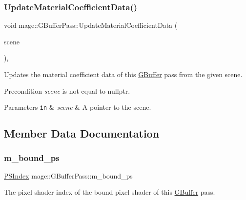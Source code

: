 \subsubsection{\texorpdfstring{Update\+Material\+Coefficient\+Data()}{UpdateMaterialCoefficientData()}}
{\footnotesize\ttfamily void mage\+::\+G\+Buffer\+Pass\+::\+Update\+Material\+Coefficient\+Data (\begin{DoxyParamCaption}\item[{const \hyperlink{structmage_1_1_pass_buffer}{Pass\+Buffer} $\ast$}]{scene }\end{DoxyParamCaption})\hspace{0.3cm}{\ttfamily [private]}, {\ttfamily [noexcept]}}

Updates the material coefficient data of this \hyperlink{structmage_1_1_g_buffer}{G\+Buffer} pass from the given scene.

\begin{DoxyPrecond}{Precondition}
{\itshape scene} is not equal to {\ttfamily nullptr}. 
\end{DoxyPrecond}

\begin{DoxyParams}[1]{Parameters}
\mbox{\tt in}  & {\em scene} & A pointer to the scene. \\
\hline
\end{DoxyParams}


\subsection{Member Data Documentation}
\hypertarget{classmage_1_1_g_buffer_pass_aef8452f64c9815d002e552957ed9e342}{}\label{classmage_1_1_g_buffer_pass_aef8452f64c9815d002e552957ed9e342} 
\subsubsection{\texorpdfstring{m\+\_\+bound\+\_\+ps}{m\_bound\_ps}}
{\footnotesize\ttfamily \hyperlink{classmage_1_1_g_buffer_pass_a1dbae3cb33d9c90ce7eb8c119d576379}{P\+S\+Index} mage\+::\+G\+Buffer\+Pass\+::m\+\_\+bound\+\_\+ps\hspace{0.3cm}{\ttfamily [private]}}

The pixel shader index of the bound pixel shader of this \hyperlink{structmage_1_1_g_buffer}{G\+Buffer} pass. \hypertarget{classmage_1_1_g_buffer_pass_a009ffc6f7d459b4bda115cfb470e1fd0}{}\label{classmage_1_1_g_buffer_pass_a009ffc6f7d459b4bda115cfb470e1fd0} 
